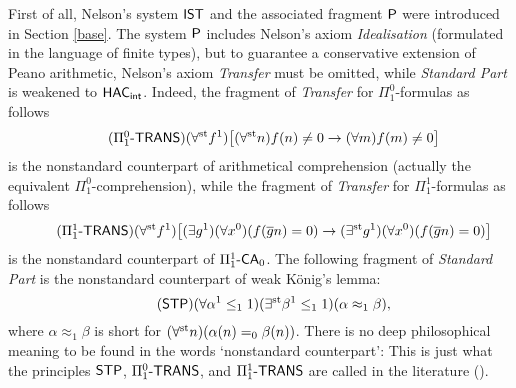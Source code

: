 \documentclass[reqno]{amsart}
\newcommand\be{\begin{equation}}
\newcommand\ee{\end{equation}}
\def\FIVE{\Pi_{1}^{1}\text{-\textsf{CA}}_{0}}
\def\IST{\textup{\textsf{IST}}}
\def\STP{\textup{\textsf{STP}}}
\def\P{\textup{\textsf{P}}}
\def\st{\textup{st}}
\def\di{\rightarrow}
\def\paai{\Pi_{1}^{0}\textup{-\textsf{TRANS}}}
\def\Paai{\Pi_{1}^{1}\textup{-\textsf{TRANS}}}
\def\HAC{\textup{\textsf{HAC}}}
\def\INT{\textup{\textsf{int}}}
\numberwithin{equation}{section}
\numberwithin{thm}{section}
\begin{document}
\medskip

First of all, Nelson's system $\IST$ and the associated fragment $\P$ were introduced in Section \ref{base}.
The system $\P$ includes Nelson's axiom \emph{Idealisation} (formulated in the language of finite types), but to guarantee a conservative extension of Peano arithmetic, Nelson's axiom \emph{Transfer} must be omitted, while \emph{Standard Part} is weakened to $\HAC_{\INT}$.  Indeed, the fragment of \emph{Transfer} for $\Pi_{1}^{0}$-formulas as follows  
\be\tag{$\paai$}
(\forall^{\st}f^{1})\big[  (\forall^{\st}n)f(n)\ne0 \di (\forall m)f(m)\ne0  \big]
\ee
is the nonstandard counterpart of arithmetical comprehension (actually the equivalent $\Pi_{1}^{0}$-comprehension), while the fragment of \emph{Transfer} for $\Pi_{1}^{1}$-formulas as follows  
\be\tag{$\Paai$}
(\forall^{\st}f^{1})\big[ (\exists g^{1})(\forall x^{0})(f(\overline{g}n)=0)\di (\exists^{\st}g^{1})(\forall x^{0})(f(\overline{g}n)=0)\big]
\ee
is the nonstandard counterpart of $\FIVE$. 
The following fragment of \emph{Standard Part} is the nonstandard counterpart of weak K\"onig's lemma:
\be\tag{$\STP$}
(\forall \alpha^{1}\leq_{1}1)(\exists^{\st}\beta^{1}\leq_{1}1)(\alpha\approx_{1}\beta),
\ee  
where $\alpha\approx_{1}\beta$ is short for $(\forall^{\st}n)(\alpha(n)=_{0}\beta(n))$.  There is no deep philosophical meaning to be found in the words `nonstandard counterpart':  This is just what the principles $\STP$, $\paai$, and $\Paai$ are called in the literature (\cite{pimpson, sambon}).    

\medskip
\end{document}
